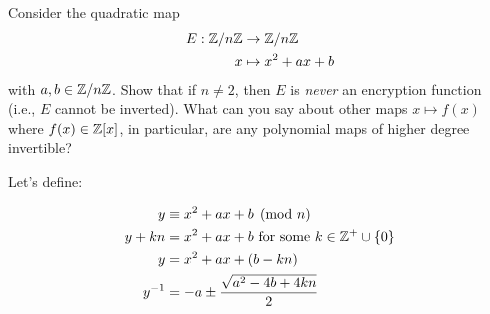 
\begin{problem}
Consider the quadratic map
\begin{align*}
E:\mathbb{Z}/n\mathbb{Z} &\to \mathbb{Z}/n\mathbb{Z} \\
x &\mapsto x^2+ax+b
\end{align*}
with $a,b \in \mathbb{Z}/n\mathbb{Z}$.  Show that if $n \neq 2$, then $E$ is
\emph{never} an encryption function (i.e., $E$ cannot be inverted).
What can you say about other maps $x \mapsto f(x)$ where $f(x) \in
\mathbb{Z}[x]$, in particular, are any polynomial maps of higher degree invertible?
\end{problem}
\begin{Answer}

Let's define: 

\begin{align*}
  y &\equiv x^2+ax+b \pmod n\\
  y + kn &=  x^2+ax+b  \text{ for some $k \in \mathbb{Z}^+ \cup \{0\}$}\\
  y &= x^2+ax+(b - kn)\\
  y^{-1} &= -a \pm \frac{\sqrt{a^{2} - 4b + 4kn}}{2}
\end{align*}

\end{Answer}
